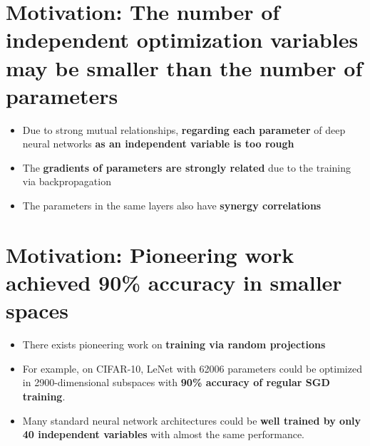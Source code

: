 \documentclass[t]{beamer}
\begin{document}
\section{Motivation: The number of independent optimization variables may be smaller than the number of parameters}
\begin{frame}
\begin{itemize}
\item Due to strong mutual relationships, \textbf{regarding each parameter} of deep neural networks \textbf{as an independent variable is too rough} \vspace{1cm}
\item The \textbf{gradients of parameters are strongly related} due to the training via backpropagation \vspace{1cm}
\item The parameters in the same layers also have \textbf{synergy correlations} \vspace{1cm}
\end{itemize}
\center{$\downarrow$}\vspace{1cm}
 \vspace{1cm}
\end{frame}



\section{Motivation: Pioneering work achieved 90\% accuracy in smaller spaces}
\begin{frame}
\begin{itemize}
\item There exists pioneering work on \textbf{training via random projections} \vspace{1cm}
\item For example, on CIFAR-10, LeNet with 62006 parameters could be optimized in 2900-dimensional subspaces with 
\textbf{90\% accuracy of regular SGD training}. \vspace{1cm}
\center{$\downarrow$} \vspace{1cm}
 \vspace{1cm}
\item{Many standard neural network architectures could be \textbf{well trained by only 40 independent variables} with almost the same performance. }
\end{itemize}
\end{frame}
\end{document}
